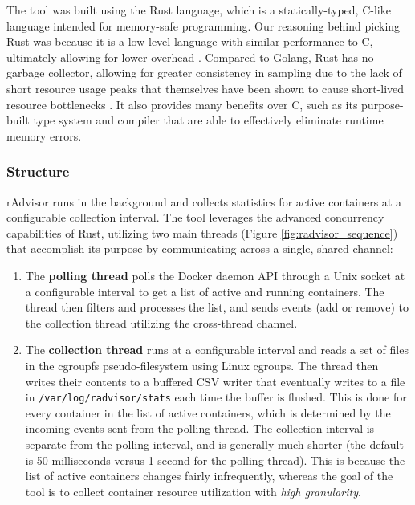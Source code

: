 \documentclass[a4paper,11pt]{article}
\newcommand{\filepath}[1]{\texttt{#1}\xspace}
\newcommand{\granularity}{\textit{high granularity}\xspace}
\begin{document}
The tool was built using the Rust language, which is a statically-typed, C-like language
intended for memory-safe programming.
Our reasoning behind picking Rust was because it is a low level language with similar performance to C,
ultimately allowing for lower overhead \cite{TheRustBook}.
Compared to Golang, Rust has no garbage collector,
allowing for greater consistency in sampling
due to the lack of short resource usage peaks
that themselves have been shown to cause short-lived resource bottlenecks \cite{Millibottleneck}.
It also provides many benefits over C, such as its purpose-built type system and compiler
that are able to effectively eliminate runtime memory errors.

\subsubsection{Structure}

rAdvisor runs in the background and collects statistics for active containers at a configurable collection interval.
The tool leverages the advanced concurrency capabilities of Rust,
utilizing two main threads (Figure \ref{fig:radvisor_sequence}) that accomplish its purpose
by communicating across a single, shared channel:

\vspace{-0.2em}
\begin{enumerate}
    \item The \textbf{polling thread} polls the Docker daemon API through a Unix socket at a configurable interval
    to get a list of active and running containers.
    The thread then filters and processes the list,
    and sends events (add or remove) to the collection thread utilizing the cross-thread channel.
    
    \item The \textbf{collection thread} runs at a configurable interval
    and reads a set of files in the cgroupfs pseudo-filesystem using Linux cgroups.
    The thread then writes their contents to a buffered CSV writer
    that eventually writes to a file in \filepath{/var/log/radvisor/stats} each time the buffer is flushed.
    This is done for every container in the list of active containers,
    which is determined by the incoming events sent from the polling thread.
    The collection interval is separate from the polling interval,
    and is generally much shorter (the default is 50 milliseconds versus 1 second for the polling thread).
    This is because the list of active containers changes fairly infrequently,
    whereas the goal of the tool is to collect container resource utilization
    with \granularity.
\end{enumerate}
\vspace{0.2em}
\end{document}
